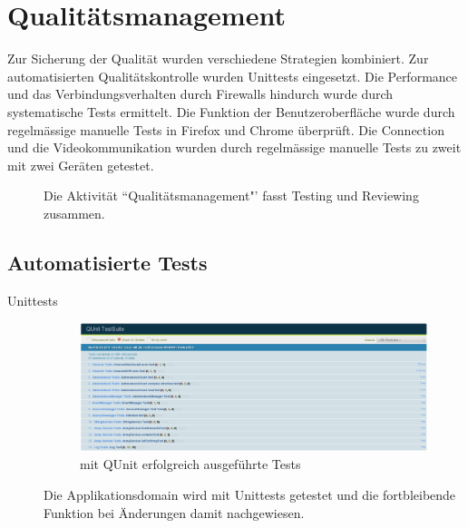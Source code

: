 \chapter{Qualitätsmanagement}
	Zur Sicherung der Qualität wurden verschiedene Strategien kombiniert. Zur automatisierten Qualitätskontrolle wurden Unittests eingesetzt. Die Performance und das Verbindungsverhalten durch Firewalls hindurch wurde durch systematische Tests ermittelt. Die Funktion der Benutzeroberfläche wurde durch regelmässige manuelle Tests in Firefox und Chrome überprüft.
	Die Connection und die Videokommunikation wurden durch regelmässige manuelle Tests zu zweit mit zwei Geräten getestet.
	
	\begin{figure}[H]
		\centering
		{\tiny
		}
		\caption{Die Aktivität ``Qualitätsmanagement"' fasst Testing und Reviewing
		zusammen.}
	\end{figure}

	\section{Automatisierte Tests}
		\begin{description}
			\item[Unittests]		
			\begin{figure}[H]
				\centering
				\includegraphics[width=1\textwidth]{../qualityManagement/unittesting.png}
				\caption{mit QUnit erfolgreich ausgeführte Tests}
				\label{unittests}
			\end{figure}
			Die Applikationsdomain wird mit Unittests getestet und die fortbleibende
			Funktion bei Änderungen damit nachgewiesen.
		\end{description}
		
